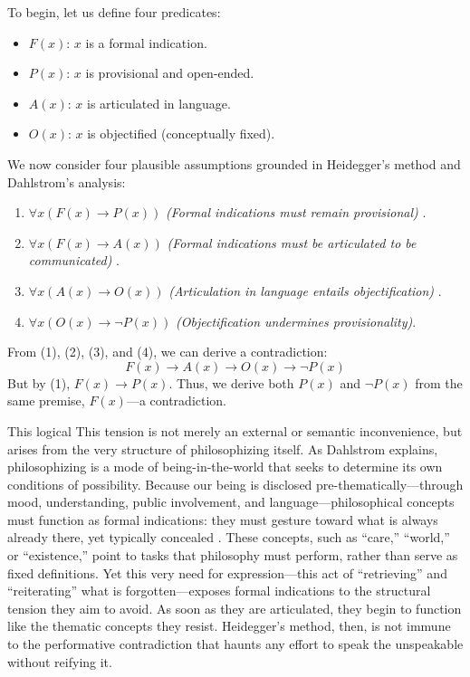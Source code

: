 \documentclass{article}
\begin{document}
To begin, let us define four predicates:
\begin{itemize}
  \item $F(x)$: $x$ is a formal indication.
  \item $P(x)$: $x$ is provisional and open-ended.
  \item $A(x)$: $x$ is articulated in language.
  \item $O(x)$: $x$ is objectified (conceptually fixed).
\end{itemize}

We now consider four plausible assumptions grounded in Heidegger’s method and Dahlstrom’s analysis:

\begin{enumerate}
  \item $\forall x (F(x) \rightarrow P(x))$ \hfill \textit{(Formal indications must remain provisional)} \parencite[pp.~781–782]{dahlstrom1994}.
  \item $\forall x (F(x) \rightarrow A(x))$ \hfill \textit{(Formal indications must be articulated to be communicated)} \parencite[p.~781]{dahlstrom1994}.
  \item $\forall x (A(x) \rightarrow O(x))$ \hfill \textit{(Articulation in language entails objectification)} \parencite[p.~783]{dahlstrom1994}.
  \item $\forall x (O(x) \rightarrow \neg P(x))$ \hfill \textit{(Objectification undermines provisionality)}.
\end{enumerate}

From (1), (2), (3), and (4), we can derive a contradiction:
\[
F(x) \rightarrow A(x) \rightarrow O(x) \rightarrow \neg P(x)
\]
But by (1), $F(x) \rightarrow P(x)$. Thus, we derive both $P(x)$ and $\neg P(x)$ from the same premise, $F(x)$—a contradiction.

This logical This tension is not merely an external or semantic inconvenience, but arises from the very structure of philosophizing itself. As Dahlstrom explains, philosophizing is a mode of being-in-the-world that seeks to determine its own conditions of possibility. Because our being is disclosed pre-thematically—through mood, understanding, public involvement, and language—philosophical concepts must function as formal indications: they must gesture toward what is always already there, yet typically concealed \parencite[pp.~789-790]{dahlstrom1994}. These concepts, such as “care,” “world,” or “existence,” point to tasks that philosophy must perform, rather than serve as fixed definitions. Yet this very need for expression—this act of “retrieving” and “reiterating” what is forgotten—exposes formal indications to the structural tension they aim to avoid. As soon as they are articulated, they begin to function like the thematic concepts they resist. Heidegger’s method, then, is not immune to the performative contradiction that haunts any effort to speak the unspeakable without reifying it.
\end{document}

